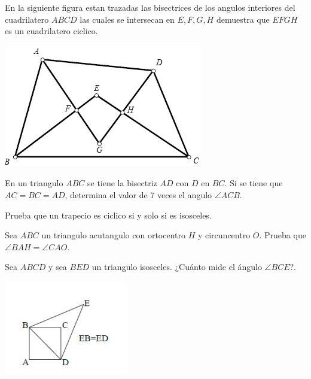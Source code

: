 \documentclass[11pt]{scrartcl}
\newcommand{\thmdifficulty}{0}
\newcommand{\problemdiff}[1]{\renewcommand{\thmdifficulty}{#1}}
\begin{document}
\problemdiff{1}
\begin{problema}
    En la siguiente figura estan trazadas las bisectrices de los angulos interiores del cuadrilatero $ABCD$ las cuales se intersecan en $E,F,G,H$ demuestra que $EFGH$ es un cuadrilatero ciclico.
    \begin{center}
        \includegraphics[scale=0.7]{I3.png}
    \end{center}
\end{problema}

\problemdiff{1}
\begin{problema} 
En un triangulo $ABC$ se tiene la bisectriz $AD$ con $D$ en $BC$. Si se tiene que $AC=BC=AD$, determina el valor de 7 veces el angulo $\angle ACB$.
\end{problema}

\problemdiff{1}
\begin{problema}
    Prueba que un trapecio es ciclico si y solo si es isosceles.
\end{problema}

\problemdiff{1}
\begin{problema}
 Sea $ABC$ un triangulo acutangulo con ortocentro $H$ y circuncentro $O$. Prueba que $\angle BAH=\angle CAO$.
\end{problema}

\problemdiff{1}
\begin{problema}
Sea $ABCD$ y sea $BED$ un triangulo isosceles. ¿Cuánto mide el ángulo $\angle BCE$?.
\begin{center}
    \includegraphics{I4.jpg}
\end{center}
\end{problema}
\end{document}
